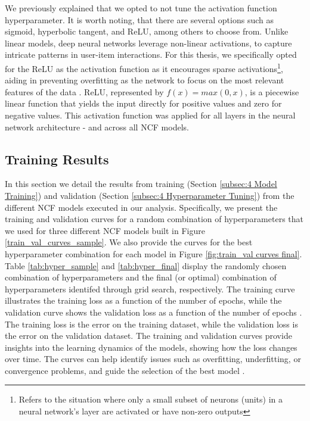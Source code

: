 We previously explained that we opted to not tune the activation function hyperparameter. It is worth noting, that there are several options such as sigmoid, hyperbolic tangent, and ReLU, among others to choose from. Unlike linear models, deep neural networks leverage non-linear activations, to capture intricate patterns in user-item interactions. For this thesis, we specifically opted for the ReLU as the activation function as it encourages sparse activations\footnote{Refers to the situation where only a small subset of neurons (units) in a neural network's layer are activated or have non-zero outputs}, aiding in preventing overfitting as the network to focus on the most relevant features of the data \cite{lecun2015deep}. ReLU, represented by $f(x)=max(0,x)$, is a piecewise linear function that yields the input directly for positive values and zero for negative values. This activation function was applied for all layers in the neural network architecture - and across all NCF models.    

\subsection{Training Results}
\label{subsec:4 Training Results}

In this section we detail the results from training (Section \ref{subsec:4 Model Training}) and validation (Section \ref{subsec:4 Hyperparameter Tuning}) from the different NCF models executed in our analysis. Specifically, we present the training and validation curves for a random combination of hyperparameters that we used for three different NCF models built in Figure \ref{train_val_curves_sample}. We also provide the curves for the best hyperparameter combination for each model in Figure \ref{fig:train_val curves final}. Table \ref{tab:hyper_sample} and \ref{tab:hyper_final} display the randomly chosen combination of hyperparameters and the final (or optimal) combination of hyperparameters identifed through grid search, respectively. 
The training curve illustrates the training loss as a function of the number of epochs, while the validation curve shows the validation loss as a function of the number of epochs \cite{abdi1999neural}. The training loss is the error on the training dataset, while the validation loss is the error on the validation dataset. The training and validation curves provide insights into the learning dynamics of the models, showing how the loss changes over time. The curves can help identify issues such as overfitting, underfitting, or convergence problems, and guide the selection of the best model \cite{goodfellow2016deep}.


